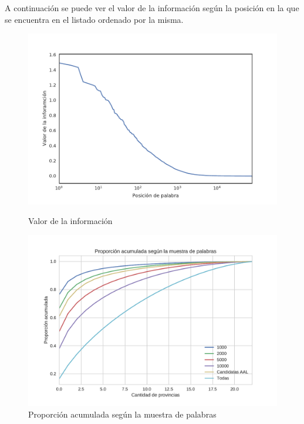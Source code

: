 A continuación se puede ver el valor de la información según la posición en la que se encuentra en el listado ordenado por la misma.

\begin{figure}[!ht]\centering
   \begin{minipage}{0.49\textwidth}
    \includegraphics[width=\linewidth]{./images/ivaluesLog.pdf}
    \caption{Valor de la información} 
    \label{fig:ivalue}
   \end{minipage}
   \begin {minipage}{0.49\textwidth}
    \includegraphics[width=\linewidth]{./images/PropAcum.pdf}
    \caption{Proporción acumulada según la muestra de palabras} 
    \label{fig:propAcum} 
   \end{minipage}
\end{figure}



